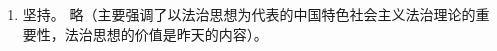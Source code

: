 \begin{enumerate}
\begin{enumerate}
\begin{enumerate}
\begin{enumerate}
                          \item 中特社根本制度、基本制度和重要制度，是中法路的。
                          \item 要坚持中法路，不断中特制，中特制。
                        \end{enumerate}
                  \item 坚持。
                        略（主要强调了以法治思想为代表的中国特色社会主义法治理论的重要性，法治思想的价值是昨天的内容）。
                \end{enumerate}
        \end{enumerate}
\end{enumerate}